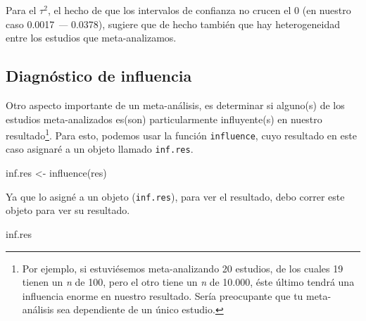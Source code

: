 \documentclass[
  bookmarksnumbered]{article}
\newenvironment{Shaded}{\begin{snugshade}}{\end{snugshade}}
\newcommand{\FunctionTok}[1]{\textcolor[rgb]{0.39,0.29,0.61}{#1}}
\newcommand{\NormalTok}[1]{\textcolor[rgb]{0.12,0.11,0.11}{#1}}
\newcommand{\OtherTok}[1]{\textcolor[rgb]{0.00,0.43,0.16}{#1}}
\begin{document}
Para el \(\tau^2\), el hecho de que los intervalos de confianza no crucen el 0 (en nuestro caso 0.0017 \emph{---} 0.0378), sugiere que de hecho también que hay heterogeneidad entre los estudios que meta-analizamos.

\hypertarget{diagnuxf3stico-de-influencia}{%
\subsection{Diagnóstico de influencia}\label{diagnuxf3stico-de-influencia}}

Otro aspecto importante de un meta-análisis, es determinar si alguno(s) de los estudios meta-analizados es(son) particularmente influyente(s) en nuestro resultado\footnote{Por ejemplo, si estuviésemos meta-analizando 20 estudios, de los cuales 19 tienen un \emph{n} de 100, pero el otro tiene un \emph{n} de 10.000, éste último tendrá una influencia enorme en nuestro resultado. Sería preocupante que tu meta-análisis sea dependiente de un único estudio.}. Para esto, podemos usar la función \texttt{influence}, cuyo resultado en este caso asignaré a un objeto llamado \texttt{inf.res}.

\begin{Shaded}
\begin{Highlighting}[]
\NormalTok{inf.res }\OtherTok{\textless{}{-}} \FunctionTok{influence}\NormalTok{(res)}
\end{Highlighting}
\end{Shaded}

Ya que lo asigné a un objeto (\texttt{inf.res}), para ver el resultado, debo correr este objeto para ver su resultado.

\begin{Shaded}
\begin{Highlighting}[]
\NormalTok{inf.res}
\end{Highlighting}
\end{Shaded}
\end{document}
